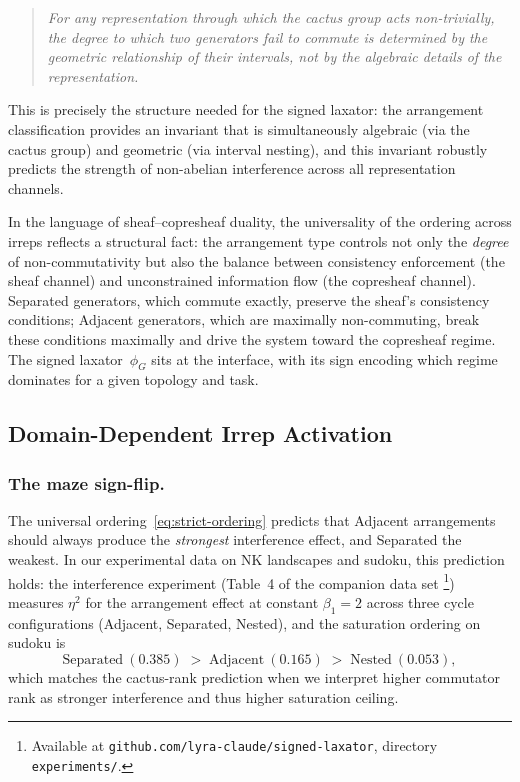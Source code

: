 \begin{quote}
\emph{For any representation through which the cactus group acts
non-trivially, the degree to which two generators fail to commute is
determined by the geometric relationship of their intervals, not by the
algebraic details of the representation.}
\end{quote}

This is precisely the structure needed for the signed laxator: the
arrangement classification provides an invariant that is simultaneously
algebraic (via the cactus group) and geometric (via interval nesting),
and this invariant robustly predicts the strength of non-abelian
interference across all representation channels.

In the language of sheaf--copresheaf duality, the universality of
the ordering across irreps reflects a structural fact: the
arrangement type controls not only the \emph{degree} of
non-commutativity but also the balance between consistency
enforcement (the sheaf channel) and unconstrained information flow
(the copresheaf channel).  Separated generators, which commute
exactly, preserve the sheaf's consistency conditions; Adjacent
generators, which are maximally non-commuting, break these conditions
maximally and drive the system toward the copresheaf regime.  The
signed laxator~$\phi_G$ sits at the interface, with its sign encoding
which regime dominates for a given topology and task.

\subsection{Domain-Dependent Irrep Activation}
\label{sec:domain-dependent-activation}

\subsubsection{The maze sign-flip.}

The universal ordering~\eqref{eq:strict-ordering} predicts that
Adjacent arrangements should always produce the \emph{strongest}
interference effect, and Separated the weakest.  In our experimental
data on NK landscapes and sudoku, this prediction holds: the
interference experiment (Table~4 of the companion data set%
\footnote{Available at
\texttt{github.com/lyra-claude/signed-laxator}, directory
\texttt{experiments/}.}) measures $\eta^2$ for the arrangement effect
at constant $\beta_1 = 2$ across three cycle configurations
(Adjacent, Separated, Nested), and the saturation ordering on sudoku
is
\[
  \text{Separated}~(0.385) \;>\;
  \text{Adjacent}~(0.165) \;>\;
  \text{Nested}~(0.053),
\]
which matches the cactus-rank prediction when we interpret higher
commutator rank as stronger interference and thus higher saturation
ceiling.

